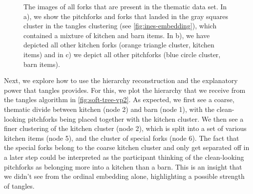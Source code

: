 \onecolumn
\begin{figure}[ht]
    \centering
    \hfill
    \hfill
    \caption{
        The images of all forks that are present in the thematic data set. In a), we show the pitchforks and forks that landed in
        the gray squares cluster in the tangles clustering (see \autoref{fig:ines-embedding}), which contained a mixture of kitchen and barn items.
        In b), we have depicted all other kitchen forks (orange triangle cluster, kitchen items) and in c) we depict all other pitchforks 
        (blue circle cluster, barn items).
    }
    \label{fig:thematic-images-forks}
\end{figure}

Next, we explore how to use the hierarchy reconstruction and the explanatory power that tangles provides. 
For this, we plot the hierarchy that we receive from the tangles algorithm in \autoref{fig:soft-tree-vp2}. 
As expected, we first see a coarse, thematic divide between kitchen (node 2) and barn (node 1), with 
the clean-looking pitchforks being placed together with the kitchen cluster. 
We then see a finer clustering of the kitchen cluster (node 2), which is split into a set of various kitchen items (node 5), and the cluster of special forks (node 6). 
The fact that the special forks belong to the coarse kitchen cluster and only get separated off in a later step could be interpreted as the participant thinking of the 
clean-looking pitchforks as belonging more into a kitchen than a barn. This is an insight that we didn't see from the ordinal embedding alone,
highlighting a possible strength of tangles.

